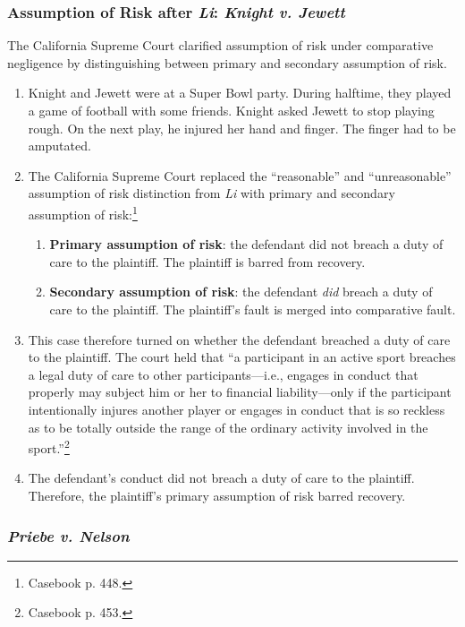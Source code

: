 \subsubsection{Assumption of Risk after \emph{Li}: \emph{Knight v. Jewett}}

The California Supreme Court clarified assumption of risk under comparative 
negligence by distinguishing between primary and secondary assumption of risk.

\begin{enumerate}
    \item Knight and Jewett were at a Super Bowl party. During halftime, they 
    played a game of football with some friends. Knight asked Jewett to stop 
    playing rough. On the next play, he injured her hand and finger. The 
    finger had to be amputated.
    \item The California Supreme Court replaced the ``reasonable'' and 
    ``unreasonable'' assumption of risk distinction from \emph{Li} with 
    primary and secondary assumption of risk:\footnote{Casebook p. 448.}
    \begin{enumerate}
        \item \textbf{Primary assumption of risk}: the defendant did not 
        breach a duty of care to the plaintiff. The plaintiff is barred from 
        recovery.
        \item \textbf{Secondary assumption of risk}: the defendant \emph{did} 
        breach a duty of care to the plaintiff. The plaintiff's fault is 
        merged into comparative fault.
    \end{enumerate}
    \item This case therefore turned on whether the defendant breached a duty 
    of care to the plaintiff. The court held that ``a participant in an active 
    sport breaches a legal duty of care to other participants---i.e., engages 
    in conduct that properly may subject him or her to financial 
    liability---only if the participant intentionally injures another player 
    or engages in conduct that is so reckless as to be totally outside the 
    range of the ordinary activity involved in the sport.''\footnote{Casebook 
    p. 453.}
    \item The defendant's conduct did not breach a duty of care to the 
    plaintiff. Therefore, the plaintiff's primary assumption of risk barred 
    recovery.
\end{enumerate}

\subsubsection{\emph{Priebe v. Nelson}} %


